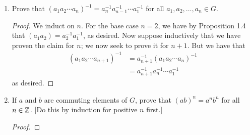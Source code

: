 \documentclass[../notes.tex]{subfiles}
\begin{document}
\begin{enumerate}[label={\textbf{\arabic*.}}]
\begin{enumerate}[label={\textbf{(\alph*)}}]
\begin{proof}
            Axiom (i): As stated in the text, the associativity of a closed subset of a group under the same operation follows from the associativity of the original group.\par
            Axiom (ii): Clearly, $1=1+0i\in\C$ and $1^1=1$, so $1\in G$. Additionally, by the definition of 1, $z\cdot 1=1\cdot z=z$, as desired.\par
            Axiom (iii): Let $z\in G$ be arbitrary. Choose $z^{-1}=z^{n-1}$. Then
            \begin{align*}
                z\cdot z^{-1} &= z\cdot z^{n-1}\\
                &= z^n\\
                &= 1\\
                &= z^n\\
                &= z^{n-1}\cdot z\\
                &= z^{-1}\cdot z
            \end{align*}
            as desired.
        \end{proof}
        \item Prove that $G$ is not a group under addition.
        \begin{proof}
            By part (a), $1\in G$. However, $1+1=2\notin G$ since $2^n$ grows exponentially and never equals 1.
        \end{proof}
    \end{enumerate}
    \setcounter{enumi}{14}
    \item Prove that $(a_1a_2\cdots a_n)^{-1}=a_n^{-1}a_{n-1}^{-1}\cdots a_1^{-1}$ for all $a_1,a_2,\dots,a_n\in G$.
    \begin{proof}
        We induct on $n$. For the base case $n=2$, we have by Proposition 1.4 that $(a_1a_2)=a_2^{-1}a_1^{-1}$, as desired. Now suppose inductively that we have proven the claim for $n$; we now seek to prove it for $n+1$. But we have that
        \begin{align*}
            (a_1a_2\cdots a_{n+1})^{-1} &= a_{n+1}^{-1}(a_1a_2\cdots a_n)^{-1}\tag*{Proposition 1.4}\\
            &= a_{n+1}^{-1}a_n^{-1}\cdots a_1^{-1}\tag*{Hypothesis}
        \end{align*}
        as desired.
    \end{proof}
    \setcounter{enumi}{23}
    \item If $a$ and $b$ are commuting elements of $G$, prove that $(ab)^n=a^nb^n$ for all $n\in\mathbb{Z}$. [Do this by induction for positive $n$ first.]
    \begin{proof}

\end{proof}
\end{enumerate}
\end{document}
